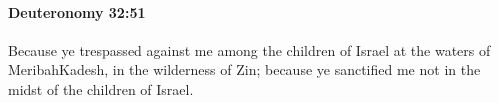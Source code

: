 
		\paragraph{Deuteronomy 32:51} %
			\label{DEUTERONOMY-32-51}

			Because ye trespassed against me among the children of Israel at the waters of MeribahKadesh, in the wilderness of Zin; because ye sanctified me not in the midst of the children of Israel.



